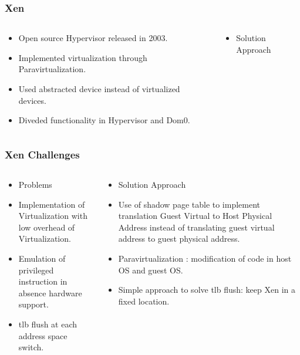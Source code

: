 \documentclass{beamer}
\begin{document}
\begin{frame} 
\frametitle{Xen}
\begin{columns}
\begin{column}{0.5\textwidth}
\begin{itemize}
\item Open source Hypervisor released in 2003. 
\item Implemented virtualization through Paravirtualization.
\item Used abstracted device instead of virtualized devices.
\item Diveded functionality in Hypervisor and Dom0.
\end{itemize}
\end{column}
\begin{column}{0.5\textwidth}
\begin{itemize}
 \item Solution Approach
\end{itemize}
\end{column}
\end{columns}
\end{frame}

\begin{frame} 
\frametitle{Xen Challenges}
\begin{columns}
\begin{column}{0.5\textwidth}
\begin{itemize}
\item Problems
\item Implementation of Virtualization with low overhead of Virtualization.
\item Emulation of privileged instruction in absence hardware support.
\item tlb flush at each address space switch.
\end{itemize}
\end{column}
\begin{column}{0.5\textwidth}
\begin{itemize}
 \item Solution Approach
 \item Use of shadow page table to implement translation 
 Guest Virtual to Host Physical Address instead of translating guest virtual address to guest physical address\cite{xen}.
 \item Paravirtualization : modification of code in host OS and guest OS.\cite{xen}
 \item Simple approach to solve tlb flush: keep Xen in a fixed location.
\end{itemize}
\end{column}
\end{columns}
\end{frame}
\end{document}

